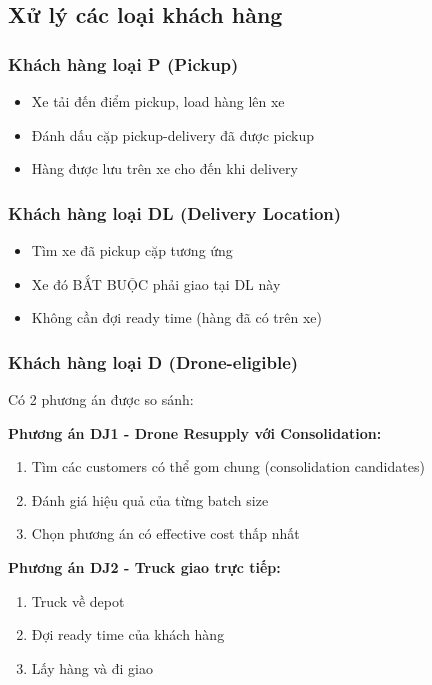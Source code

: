 \documentclass[12pt,a4paper]{article}
\begin{document}
\subsection{Xử lý các loại khách hàng}

\subsubsection{Khách hàng loại P (Pickup)}

\begin{itemize}
    \item Xe tải đến điểm pickup, load hàng lên xe
    \item Đánh dấu cặp pickup-delivery đã được pickup
    \item Hàng được lưu trên xe cho đến khi delivery
\end{itemize}

\subsubsection{Khách hàng loại DL (Delivery Location)}

\begin{itemize}
    \item Tìm xe đã pickup cặp tương ứng
    \item Xe đó BẮT BUỘC phải giao tại DL này
    \item Không cần đợi ready time (hàng đã có trên xe)
\end{itemize}

\subsubsection{Khách hàng loại D (Drone-eligible)}

Có 2 phương án được so sánh:

\textbf{Phương án DJ1 - Drone Resupply với Consolidation:}
\begin{enumerate}
    \item Tìm các customers có thể gom chung (consolidation candidates)
    \item Đánh giá hiệu quả của từng batch size
    \item Chọn phương án có effective cost thấp nhất
\end{enumerate}

\textbf{Phương án DJ2 - Truck giao trực tiếp:}
\begin{enumerate}
    \item Truck về depot
    \item Đợi ready time của khách hàng
    \item Lấy hàng và đi giao
\end{enumerate}
\end{document}
